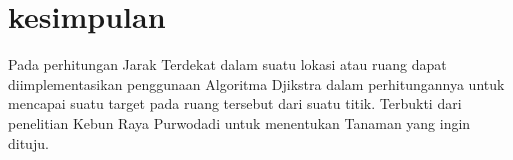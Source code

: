 \documentclass[conference]{IEEEtran}
\begin{document}
\section{kesimpulan}
	Pada perhitungan Jarak Terdekat dalam suatu lokasi atau ruang dapat diimplementasikan penggunaan Algoritma Djikstra dalam perhitungannya untuk mencapai suatu target pada ruang tersebut dari suatu titik. Terbukti dari penelitian Kebun Raya Purwodadi untuk menentukan Tanaman yang ingin dituju.


\end{document}
